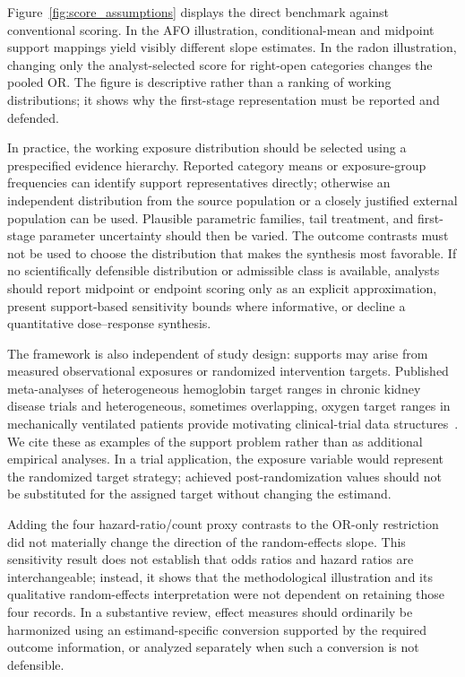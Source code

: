 \documentclass[journal=rsm]{CUP-JNL-DTM}%
\theoremstyle{definition}
\numberwithin{equation}{section}
\begin{document}
Figure~\ref{fig:score_assumptions} displays the direct benchmark against
conventional scoring. In the AFO illustration, conditional-mean and midpoint
support mappings yield visibly different slope estimates. In the radon
illustration, changing only the analyst-selected score for right-open categories
changes the pooled OR. The figure is descriptive rather than a ranking of
working distributions; it shows why the first-stage representation must be
reported and defended.

In practice, the working exposure distribution should be selected using a
prespecified evidence hierarchy. Reported category means or exposure-group
frequencies can identify support representatives directly; otherwise an
independent distribution from the source population or a closely justified
external population can be used. Plausible parametric families, tail treatment,
and first-stage parameter uncertainty should then be varied. The outcome
contrasts must not be used to choose the distribution that makes the synthesis
most favorable. If no scientifically defensible distribution or admissible
class is available, analysts should report midpoint or endpoint scoring only as
an explicit approximation, present support-based sensitivity bounds where
informative, or decline a quantitative dose--response synthesis.

The framework is also independent of study design: supports may arise from measured
observational exposures or randomized intervention targets. Published
meta-analyses of heterogeneous hemoglobin target ranges in chronic kidney
disease trials and heterogeneous, sometimes overlapping, oxygen target ranges
in mechanically ventilated patients provide motivating clinical-trial data
structures~\cite{Jing2012,Cumpstey2022}. We cite these as examples of the
support problem rather than as additional empirical analyses. In a trial
application, the exposure variable would represent the randomized target
strategy; achieved post-randomization values should not be substituted for the
assigned target without changing the estimand.

Adding the four hazard-ratio/count proxy contrasts to the OR-only restriction
did not materially change the direction of the random-effects slope. This
sensitivity result does not establish that odds
ratios and hazard ratios are interchangeable; instead, it shows that the
methodological illustration and its qualitative random-effects interpretation
were not dependent on retaining those four records. In a substantive review,
effect measures should ordinarily be harmonized using an estimand-specific
conversion supported by the required outcome information, or analyzed
separately when such a conversion is not defensible.
\end{document}
